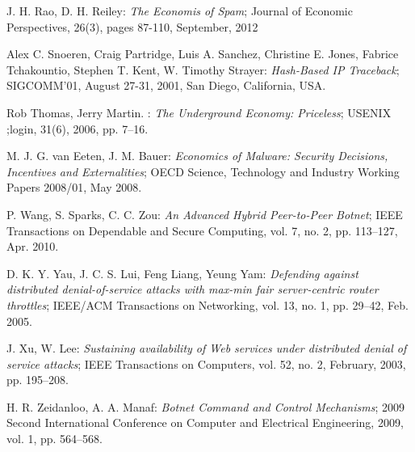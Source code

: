 \begin{thebibliography}{99}
 J. H. Rao, D. H. Reiley: \emph{The Economis of Spam}; Journal of Economic Perspectives, 26(3), pages 87-110, September, 2012

 Alex C. Snoeren, Craig Partridge, Luis A. Sanchez, Christine E. Jones, Fabrice Tchakountio, Stephen T. Kent, W. Timothy Strayer: \emph{Hash-Based IP Traceback}; SIGCOMM'01, August 27-31, 2001, San Diego, California, USA.

 Rob Thomas, Jerry Martin. : \emph{The Underground Economy: Priceless}; USENIX ;login, 31(6), 2006, pp. 7--16.

 M. J. G. van Eeten, J. M. Bauer: \emph{Economics of Malware: Security Decisions, Incentives and Externalities}; OECD Science, Technology and Industry Working Papers 2008/01, May 2008.

 P. Wang, S. Sparks, C. C. Zou: \emph{An Advanced Hybrid Peer-to-Peer Botnet}; IEEE Transactions on Dependable and Secure Computing, vol. 7, no. 2, pp. 113--127, Apr. 2010.

 D. K. Y. Yau, J. C. S. Lui, Feng Liang, Yeung Yam: \emph{Defending against distributed denial-of-service attacks with max-min fair server-centric router throttles}; IEEE/ACM Transactions on Networking, vol. 13, no. 1, pp. 29--42, Feb. 2005.

 J. Xu, W. Lee: \emph{Sustaining availability of Web services under distributed denial of service attacks}; IEEE Transactions on Computers, vol. 52, no. 2, February, 2003, pp. 195--208.

 H. R. Zeidanloo, A. A. Manaf: \emph{Botnet Command and Control Mechanisms}; 2009 Second International Conference on Computer and Electrical Engineering, 2009, vol. 1, pp. 564--568.

\end{thebibliography}




